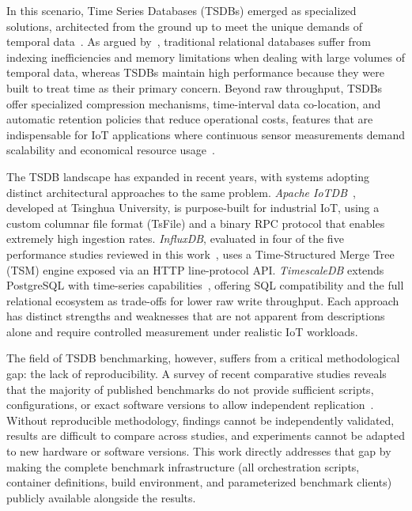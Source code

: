 In this scenario, Time Series Databases (TSDBs) emerged as specialized solutions, architected
from the ground up to meet the unique demands of temporal data~\citep{InfluxDataTimeSeries}.
As argued by~\cite{naqvi2017influxdb}, traditional relational databases suffer from indexing
inefficiencies and memory limitations when dealing with large volumes of temporal data, whereas
TSDBs maintain high performance because they were built to treat time as their primary concern.
Beyond raw throughput, TSDBs offer specialized compression mechanisms, time-interval data
co-location, and automatic retention policies that reduce operational costs, features that
are indispensable for IoT applications where continuous sensor measurements demand scalability
and economical resource usage~\citep{Dunning2014}.

The TSDB landscape has expanded in recent years, with systems adopting distinct
architectural approaches to the same problem. \textit{Apache IoTDB}~\cite{wang2023iotdb},
developed at Tsinghua University, is purpose-built for industrial IoT, using a custom columnar
file format (TsFile) and a binary RPC protocol that enables extremely high ingestion rates.
\textit{InfluxDB}, evaluated in four of the five performance studies reviewed in this
work~\citep{naqvi2017influxdb,shah2022performance,lima2024avaliando,wang2023iotdb}, uses a
Time-Structured Merge Tree (TSM) engine exposed via an HTTP line-protocol API. \textit{TimescaleDB}
extends PostgreSQL with time-series capabilities~\citep{Ramakrishnan2003}, offering SQL compatibility
and the full relational ecosystem as trade-offs for lower raw write throughput. Each approach has
distinct strengths and weaknesses that are not apparent from descriptions alone and require
controlled measurement under realistic IoT workloads.

The field of TSDB benchmarking, however, suffers from a critical methodological gap: the lack of
reproducibility. A survey of recent comparative studies reveals that the majority of published
benchmarks do not provide sufficient scripts, configurations, or exact software versions to
allow independent replication~\citep{pereira2023mulletbench,shah2022performance,naqvi2017influxdb}.
Without reproducible methodology, findings cannot be independently validated, results are
difficult to compare across studies, and experiments cannot be adapted to new hardware or
software versions. This work directly addresses that gap by making the complete benchmark
infrastructure (all orchestration scripts, container definitions, build environment, and
parameterized benchmark clients) publicly available alongside the results.

